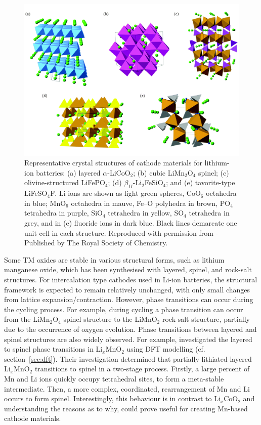\documentclass[../main.tex]{subfiles}
\begin{document}
\begin{figure}
    \centering
    \includegraphics[scale=0.5]{figures/cathode_structures.pdf}
    \caption{Representative crystal structures of cathode materials for lithium-ion batteries: (a) layered $\alpha$-LiCoO$_2$; (b) cubic LiMn$_2$O$_4$ spinel; (c) olivine-structured LiFePO$_4$; (d) $\beta_{II}$-Li$_2$FeSiO$_4$; and (e) tavorite-type LiFeSO$_4$F. Li ions are shown as light green spheres, CoO$_6$ octahedra in blue; MnO$_6$ octahedra in mauve, Fe–O polyhedra in brown, PO$_4$ tetrahedra in purple, SiO$_4$ tetrahedra in yellow, SO$_4$ tetrahedra in grey, and in (e) fluoride ions in dark blue. Black lines demarcate one unit cell in each structure. Reproduced with permission from \citeauthor{islam2014lithium} \cite{islam2014lithium} - Published by The Royal Society of Chemistry.}
    \label{fig:cathode_structures}
\end{figure}

Some TM oxides are stable in various structural forms, such as lithium manganese oxide, which has been synthesised with layered, \cite{armstrong1996synthesis} spinel, \cite{mosbah1983phases} and rock-salt structures. \cite{dittrich1969kristallstruktur} For intercalation type cathodes used in Li-ion batteries, the structural framework is expected to remain relatively unchanged, with only small changes from lattice expansion/contraction. However, phase transitions can occur during the cycling process. For example, during cycling a phase transition can occur from the LiMn$_2$O$_4$ spinel structure to the LiMnO$_2$ rock-salt structure, partially due to the occurrence of oxygen evolution. \cite{peng2017atomistic} Phase transitions between layered and spinel structures are also widely observed. \cite{chen2018understanding} For example, \citeauthor{reed2001layered} investigated the layered to spinel phase transitions in Li$_x$MnO$_2$ using DFT modelling (cf. section~\ref{sec:dft}). \cite{reed2001layered} Their investigation determined that partially lithiated layered Li$_x$MnO$_2$ transitions to spinel in a two-stage process. Firstly, a large percent of Mn and Li ions quickly occupy tetrahedral sites, to form a meta-stable intermediate. Then, a more complex, coordinated, rearrangement of Mn and Li occurs to form spinel. Interestingly, this behaviour is in contrast to Li$_x$CoO$_2$ and understanding the reasons as to why, could prove useful for creating Mn-based cathode materials.
\end{document}
